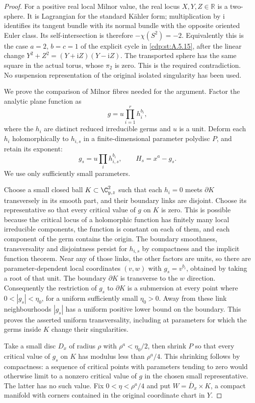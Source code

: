\begin{proof}
For a positive real local Milnor value, the real
locus $X,Y,Z\in\mathbb R$ is a two-sphere. It is
Lagrangian for the standard K\"ahler form; multiplication
by $\mathrm i$ identifies its tangent bundle with
its normal bundle with the opposite oriented Euler
class. Its self-intersection is therefore
$-\chi(S^2)=-2$. Equivalently this is the case
$a=2$, $b=c=1$ of the explicit cycle in \ref{cdp:st:A.5.15},
after the linear change $Y^2+Z^2=(Y+\mathrm iZ)(Y-\mathrm iZ)$.
The transported sphere has the same square in the
actual torus, whose $\pi_2$ is zero. This is the
required contradiction. No suspension representation
of the original isolated singularity has been used.

We prove the comparison of Milnor fibres needed for
the argument. Factor the analytic plane function as
\[
                   g=u\prod_{i=1}^r h_i^{b_i},
\]
where the $h_i$ are distinct reduced irreducible
germs and $u$ is a unit. Deform each $h_i$
holomorphically to $h_{i,s}$ in a finite-dimensional
parameter polydisc $P$, and retain its exponent:
\[
 g_s=u\prod_i h_{i,s}^{b_i},\qquad
 H_s=x^a-g_s.                                    \tag{A.J.39}\label{cdp:eq:A.J.39}
\]
We use only sufficiently small parameters.

Choose a small closed ball $K\subset\C^2_{y,z}$
such that each $h_i=0$ meets $\partial K$
transversely in its smooth part, and their boundary
links are disjoint. Choose its representative so
that every critical value of $g$ on $K$ is zero.
This is possible because the critical locus of a
holomorphic function has finitely many local
irreducible components, the function is constant
on each of them, and each component of the germ
contains the origin. The boundary smoothness,
transversality and disjointness persist for
$h_{i,s}$ by compactness and the implicit function
theorem. Near any of those links, the other factors
are units, so there are parameter-dependent local
coordinates $(v,w)$ with $g_s=v^{b_i}$, obtained
by taking a root of that unit. The boundary
$\partial K$ is transverse to the $w$ direction.
Consequently the restriction of $g_s$ to
$\partial K$ is a submersion at every point where
$0<|g_s|<\eta_0$, for a uniform sufficiently small
$\eta_0>0$. Away from these link neighbourhoods
$|g_s|$ has a uniform positive lower bound on the
boundary. This proves the asserted uniform
transversality, including at parameters for which
the germs inside $K$ change their singularities.

Take a small disc $D_x$ of radius $\rho$ with
$\rho^a<\eta_0/2$, then shrink $P$ so that every
critical value of $g_s$ on $K$ has modulus less than
$\rho^a/4$. This shrinking follows by compactness:
a sequence of critical points with parameters
tending to zero would otherwise limit to a
nonzero critical value of $g$ in the chosen small
representative. The latter has no such value.
Fix $0<\eta<\rho^a/4$ and put
$W=\overline D_x\times K$, a compact manifold
with corners contained in the original coordinate
chart in $Y$.


\end{proof}
